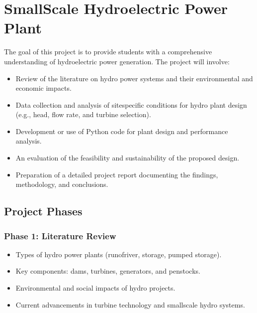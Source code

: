 \documentclass[letterpaper,10pt,english]{jupyterBook}
\begin{document}
\section{Small\sphinxhyphen{}Scale Hydroelectric Power Plant}
\label{\detokenize{ProjectInstructions:small-scale-hydroelectric-power-plant}}
\sphinxAtStartPar
The goal of this project is to provide students with a comprehensive
understanding of hydroelectric power generation. The project will
involve:
\begin{itemize}
\item {} 
\sphinxAtStartPar
Review of the literature on hydro power systems and their
environmental and economic impacts.

\item {} 
\sphinxAtStartPar
Data collection and analysis of site\sphinxhyphen{}specific conditions for hydro
plant design (e.g., head, flow rate, and turbine selection).

\item {} 
\sphinxAtStartPar
Development or use of Python code for plant design and performance
analysis.

\item {} 
\sphinxAtStartPar
An evaluation of the feasibility and sustainability of the proposed
design.

\item {} 
\sphinxAtStartPar
Preparation of a detailed project report documenting the findings,
methodology, and conclusions.

\end{itemize}


\subsection{Project Phases}
\label{\detokenize{ProjectInstructions:id14}}

\subsubsection{Phase 1: Literature Review}
\label{\detokenize{ProjectInstructions:id15}}
\sphinxAtStartPar
{}
\begin{itemize}
\item {} 
\sphinxAtStartPar
Types of hydro power plants (run\sphinxhyphen{}of\sphinxhyphen{}river, storage, pumped storage).

\item {} 
\sphinxAtStartPar
Key components: dams, turbines, generators, and penstocks.

\item {} 
\sphinxAtStartPar
Environmental and social impacts of hydro projects.

\item {} 
\sphinxAtStartPar
Current advancements in turbine technology and small\sphinxhyphen{}scale hydro
systems.

\end{itemize}
\end{document}
